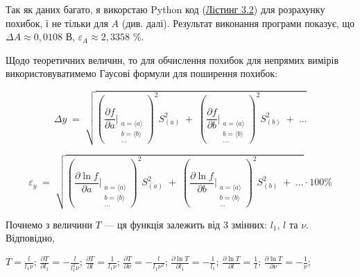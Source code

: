 \documentclass[12pt,a4paper]{article}
\begin{document}
    Так як даних багато, я викорстаю Python код (\hyperlink{listing2}{Лістинг 3.2}) для розрахунку похибок, і не тільки для $A$ (див. далі). Результат виконання програми показує, що $\Delta A \approx 0,0108$ В, $\varepsilon_{A} \approx 2,3358$ \%.

    Щодо теоретичних величин, то для обчислення похибок для непрямих вимірів використовуватимемо Гаусові формули для поширення похибок:

    \[
        \Delta y \;=\;
        \sqrt{
        \left(
            \frac{\partial f}{\partial a}\Bigg|_{\substack{a=\langle a\rangle \\ b=\langle b\rangle \\ \dots}}
        \right)^{2} S_{(a)}^{2}
        \;+\;
        \left(
            \frac{\partial f}{\partial b}\Bigg|_{\substack{a=\langle a\rangle \\ b=\langle b\rangle \\ \dots}}
        \right)^{2} S_{(b)}^{2}
        \;+\;\dots
        }
    \]

    \[
        \varepsilon_y \;=\;
        \sqrt{
        \left(
            \frac{\partial \ln f}{\partial a}\Bigg|_{\substack{a=\langle a\rangle \\ b=\langle b\rangle \\ \dots}}
        \right)^{2} S_{(a)}^{2}
        \;+\;
        \left(
            \frac{\partial \ln f}{\partial b}\Bigg|_{\substack{a=\langle a\rangle \\ b=\langle b\rangle \\ \dots}}
        \right)^{2} S_{(b)}^{2}
        \;+\;\dots
        } \cdot 100 \%
    \]

    \vspace{1em} %

    Почнемо з величини $T$ --- ця функція залежить від 3 змінних: $l_1$, $l$ та $\nu$. Відповідно,

    \begin{center}

        $\displaystyle T = \frac{l}{l_1 \nu}$; $\displaystyle \frac{\partial T}{\partial l_1} = -\frac{l}{l_1^2 \nu}$; $\displaystyle \frac{\partial T}{\partial l} = \frac{1}{l_1 \nu}$; $\displaystyle \frac{\partial T}{\partial \nu} = -\frac{l}{l_1 \nu^2}$;
        $\displaystyle \frac{\partial \ln T}{\partial l_1} = -\frac{1}{l_1}$; $\displaystyle \frac{\partial \ln T}{\partial l} = \frac{1}{l}$; $\displaystyle \frac{\partial \ln T}{\partial \nu} = -\frac{1}{\nu}$;

    \end{center}
\end{document}
